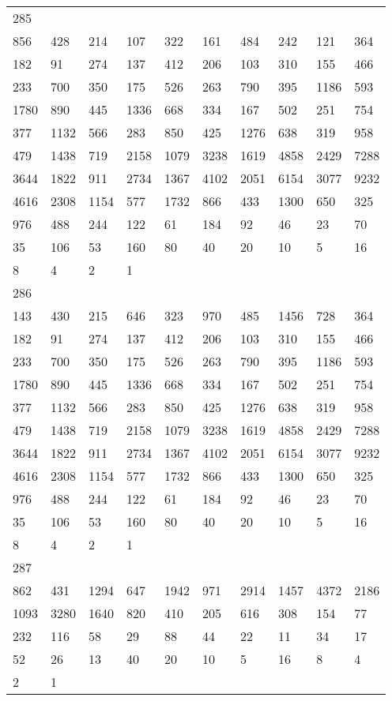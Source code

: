 \begin{longtable}{*{10}{l}}
285&&&&&&&&&\\
856& 428& 214& 107& 322& 161& 484& 242& 121& 364\\
182& 91& 274& 137& 412& 206& 103& 310& 155& 466\\
233& 700& 350& 175& 526& 263& 790& 395& 1186& 593\\
1780& 890& 445& 1336& 668& 334& 167& 502& 251& 754\\
377& 1132& 566& 283& 850& 425& 1276& 638& 319& 958\\
479& 1438& 719& 2158& 1079& 3238& 1619& 4858& 2429& 7288\\
3644& 1822& 911& 2734& 1367& 4102& 2051& 6154& 3077& 9232\\
4616& 2308& 1154& 577& 1732& 866& 433& 1300& 650& 325\\
976& 488& 244& 122& 61& 184& 92& 46& 23& 70\\
35& 106& 53& 160& 80& 40& 20& 10& 5& 16\\
8& 4& 2& 1& \\

286&&&&&&&&&\\
143& 430& 215& 646& 323& 970& 485& 1456& 728& 364\\
182& 91& 274& 137& 412& 206& 103& 310& 155& 466\\
233& 700& 350& 175& 526& 263& 790& 395& 1186& 593\\
1780& 890& 445& 1336& 668& 334& 167& 502& 251& 754\\
377& 1132& 566& 283& 850& 425& 1276& 638& 319& 958\\
479& 1438& 719& 2158& 1079& 3238& 1619& 4858& 2429& 7288\\
3644& 1822& 911& 2734& 1367& 4102& 2051& 6154& 3077& 9232\\
4616& 2308& 1154& 577& 1732& 866& 433& 1300& 650& 325\\
976& 488& 244& 122& 61& 184& 92& 46& 23& 70\\
35& 106& 53& 160& 80& 40& 20& 10& 5& 16\\
8& 4& 2& 1& \\

287&&&&&&&&&\\
862& 431& 1294& 647& 1942& 971& 2914& 1457& 4372& 2186\\
1093& 3280& 1640& 820& 410& 205& 616& 308& 154& 77\\
232& 116& 58& 29& 88& 44& 22& 11& 34& 17\\
52& 26& 13& 40& 20& 10& 5& 16& 8& 4\\
2& 1& \\


\end{longtable}
